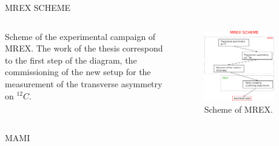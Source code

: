 \documentclass[9pt,a4paper]{beamer}
\begin{document}
\begin{frame}[t]{MREX SCHEME}
\begin{columns}[T]
\begin{column}{0.40\textwidth}
Scheme of the experimental campaign of MREX. The work of the thesis correspond to the first step of the diagram, the commissioning of the new setup for the measurement of the transverse asymmetry on $^{12}C$.
\end{column}
\begin{column}{0.60\textwidth}
\begin{figure}
\centering
\includegraphics[width = 0.85\textwidth]{SchemeMrex.pdf}
\caption{\footnotesize Scheme of MREX.}
\end{figure}
\end{column}
\end{columns}
\end{frame}


\begin{frame}[noframenumbering]{MAMI}
\begin{center}
\end{center}
\end{frame}
\end{document}
